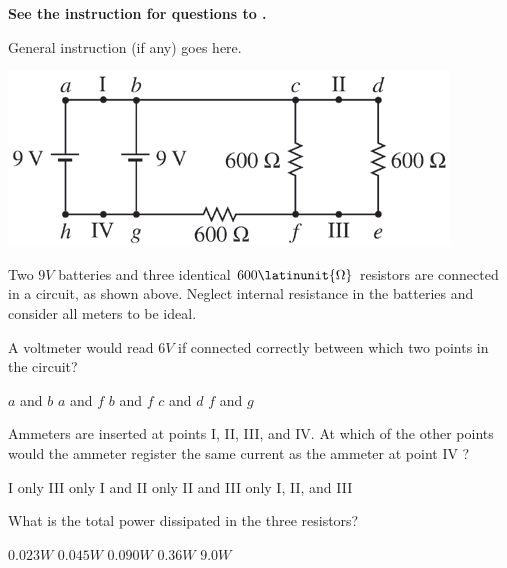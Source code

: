 \textbf{See the instruction for questions  to .}

General instruction (if any) goes here.

\begin{center}
\includegraphics[scale=0.5]{images/img-006-017.png}
\end{center}

Two $9\unit{V}$ batteries and three identical $600\latinunit{\Omega}$ resistors are connected in a circuit, as shown above. Neglect internal resistance in the batteries and consider all meters to be ideal.

\begin{questions}\setcounter{question}{18}\question
A voltmeter would read $6\unit{V}$ if connected correctly between which two points in the circuit?

\begin{oneparchoices}
\choice $a$ and $b$
\choice $a$ and $f$
\choice $b$ and $f$
\choice $c$ and $d$
\choice $f$ and $g$
\end{oneparchoices}\end{questions}

\begin{questions}\setcounter{question}{19}\question
Ammeters are inserted at points I, II, III, and IV. At which of the other points would the ammeter register the same current as the ammeter at point IV ?

\begin{oneparchoices}
\choice I only
\choice III only
\choice I and II only
\choice II and III only
\choice I, II, and III
\end{oneparchoices}\end{questions}

\begin{questions}\setcounter{question}{20}\question
What is the total power dissipated in the three resistors?

\begin{oneparchoices}
\choice $0.023 \unit{W}$
\choice $0.045 \unit{W}$
\choice $0.090 \unit{W}$
\choice $0.36 \unit{W}$
\choice $9.0 \unit{W}$
\end{oneparchoices}\end{questions}

